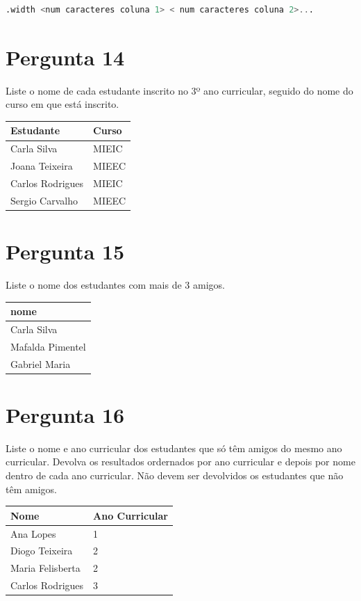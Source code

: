 {\begin{lstlisting}[language=SQL,numbers=none]
.width <num caracteres coluna 1> < num caracteres coluna 2>...
\end{lstlisting}

\section{Pergunta 14}
Liste o nome de cada estudante inscrito no 3º ano curricular, seguido do nome do curso em que está inscrito.
\begin{center} \begin{tabular}{l | l}
    \textbf{Estudante} & \textbf{Curso} \\ \hline
    Carla Silva        & MIEIC          \\
    Joana Teixeira     & MIEEC          \\
    Carlos Rodrigues   & MIEIC          \\
    Sergio Carvalho    & MIEEC
\end{tabular} \end{center}
\ansseparator


\section{Pergunta 15}
Liste o nome dos estudantes com mais de 3 amigos.
\begin{center} \begin{tabular}{l}
    \textbf{nome}    \\ \hline
    Carla Silva      \\
    Mafalda Pimentel \\
    Gabriel Maria
\end{tabular} \end{center}


\section{Pergunta 16}
Liste o nome e ano curricular dos estudantes que só têm amigos do mesmo ano curricular. Devolva os resultados ordernados por ano curricular e depois por nome dentro de cada ano curricular. Não devem ser devolvidos os estudantes que não têm amigos.
\begin{center} \begin{tabular}{l | l}
    \textbf{Nome}    & \textbf{Ano Curricular} \\ \hline
    Ana Lopes        & 1                       \\
    Diogo Teixeira   & 2                       \\
    Maria Felisberta & 2                       \\
    Carlos Rodrigues & 3
\end{tabular} \end{center}


}
